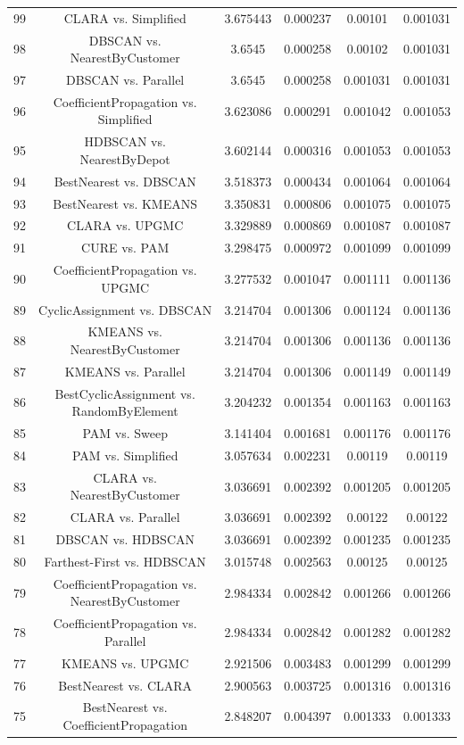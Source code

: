 \documentclass[a4paper,10pt]{article}
\begin{document}
\begin{landscape}
\begin{table}[!htp]
\begin{tabular}{cccccc}
99&CLARA vs. Simplified&3.675443&0.000237&0.00101&0.001031\\
98&DBSCAN vs. NearestByCustomer&3.6545&0.000258&0.00102&0.001031\\
97&DBSCAN vs. Parallel&3.6545&0.000258&0.001031&0.001031\\
96&CoefficientPropagation vs. Simplified&3.623086&0.000291&0.001042&0.001053\\
95&HDBSCAN vs. NearestByDepot&3.602144&0.000316&0.001053&0.001053\\
94&BestNearest vs. DBSCAN&3.518373&0.000434&0.001064&0.001064\\
93&BestNearest vs. KMEANS&3.350831&0.000806&0.001075&0.001075\\
92&CLARA vs. UPGMC&3.329889&0.000869&0.001087&0.001087\\
91&CURE vs. PAM&3.298475&0.000972&0.001099&0.001099\\
90&CoefficientPropagation vs. UPGMC&3.277532&0.001047&0.001111&0.001136\\
89&CyclicAssignment vs. DBSCAN&3.214704&0.001306&0.001124&0.001136\\
88&KMEANS vs. NearestByCustomer&3.214704&0.001306&0.001136&0.001136\\
87&KMEANS vs. Parallel&3.214704&0.001306&0.001149&0.001149\\
86&BestCyclicAssignment vs. RandomByElement&3.204232&0.001354&0.001163&0.001163\\
85&PAM vs. Sweep&3.141404&0.001681&0.001176&0.001176\\
84&PAM vs. Simplified&3.057634&0.002231&0.00119&0.00119\\
83&CLARA vs. NearestByCustomer&3.036691&0.002392&0.001205&0.001205\\
82&CLARA vs. Parallel&3.036691&0.002392&0.00122&0.00122\\
81&DBSCAN vs. HDBSCAN&3.036691&0.002392&0.001235&0.001235\\
80&Farthest-First vs. HDBSCAN&3.015748&0.002563&0.00125&0.00125\\
79&CoefficientPropagation vs. NearestByCustomer&2.984334&0.002842&0.001266&0.001266\\
78&CoefficientPropagation vs. Parallel&2.984334&0.002842&0.001282&0.001282\\
77&KMEANS vs. UPGMC&2.921506&0.003483&0.001299&0.001299\\
76&BestNearest vs. CLARA&2.900563&0.003725&0.001316&0.001316\\
75&BestNearest vs. CoefficientPropagation&2.848207&0.004397&0.001333&0.001333\\

\end{tabular}
\end{table}
\end{landscape}
\end{document}
